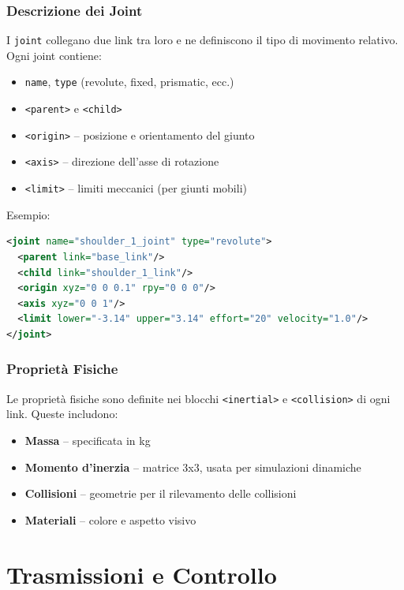 \documentclass[11pt]{report}
\begin{document}
\subsubsection*{Descrizione dei Joint}

I \texttt{joint} collegano due link tra loro e ne definiscono il tipo di movimento relativo. Ogni joint contiene:

\begin{itemize}
    \item \texttt{name}, \texttt{type} (revolute, fixed, prismatic, ecc.)
    \item \texttt{<parent>} e \texttt{<child>}
    \item \texttt{<origin>} – posizione e orientamento del giunto
    \item \texttt{<axis>} – direzione dell’asse di rotazione
    \item \texttt{<limit>} – limiti meccanici (per giunti mobili)
\end{itemize}

Esempio:

\begin{lstlisting}[language=xml]
<joint name="shoulder_1_joint" type="revolute">
  <parent link="base_link"/>
  <child link="shoulder_1_link"/>
  <origin xyz="0 0 0.1" rpy="0 0 0"/>
  <axis xyz="0 0 1"/>
  <limit lower="-3.14" upper="3.14" effort="20" velocity="1.0"/>
</joint>
\end{lstlisting}

\subsubsection*{Proprietà Fisiche}

Le proprietà fisiche sono definite nei blocchi \texttt{<inertial>} e \texttt{<collision>} di ogni link. Queste includono:

\begin{itemize}
    \item \textbf{Massa} – specificata in kg
    \item \textbf{Momento d’inerzia} – matrice 3x3, usata per simulazioni dinamiche
    \item \textbf{Collisioni} – geometrie per il rilevamento delle collisioni
    \item \textbf{Materiali} – colore e aspetto visivo
\end{itemize}

\section*{Trasmissioni e Controllo}
\end{document}
